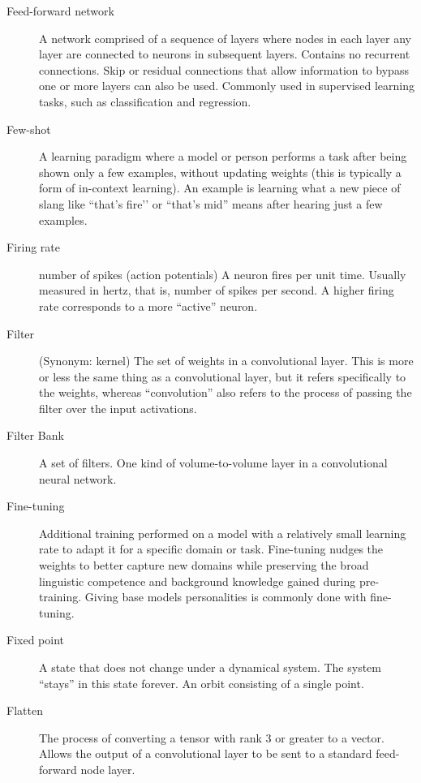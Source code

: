 \begin{description}
\item[Feed-forward network] A network comprised of a sequence of layers where nodes in each layer any layer are connected to neurons in subsequent layers. Contains no recurrent connections. Skip or residual connections that allow information to bypass one or more layers can also be used. Commonly used in supervised learning tasks, such as classification and regression.

\item[Few-shot] A learning paradigm where a model or person performs a task after being shown only a few examples, without updating weights (this is typically a form of in-context learning). An example is learning what a new piece of slang like ``that’s fire’’ or ``that’s mid'' means after hearing just a few examples.

\item[Firing rate] number of spikes (action potentials) A neuron fires per unit time. Usually measured in hertz, that is, number of spikes per second. A higher firing rate corresponds to a more ``active'' neuron. 

\item[Filter] (Synonym: kernel) The set of weights in a convolutional layer. This is more or less the same thing as a convolutional layer, but it refers specifically to the weights, whereas ``convolution'' also refers to the process of passing the filter over the input activations.

\item[Filter Bank] A set of filters. One kind of volume-to-volume layer in a convolutional neural network. 

\item[Fine-tuning] Additional training performed on a model with a relatively small learning rate to adapt it for a specific domain or task. Fine-tuning nudges the weights to better capture new domains while preserving the broad linguistic competence and background knowledge gained during pre-training. Giving base models personalities is commonly done with fine-tuning.

\item[Fixed point] A state that does not change under a dynamical system. The system ``stays'' in this state forever. An orbit consisting of a single point.

\item[Flatten] The process of converting a tensor with rank 3 or greater to a vector.  Allows the output of a convolutional layer to be sent to a standard feed-forward node layer.


\end{description}
